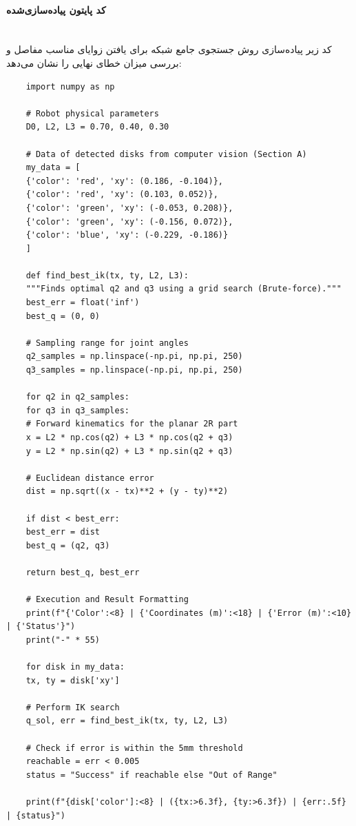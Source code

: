 \documentclass{article}
\begin{document}
\paragraph{کد پایتون پیاده‌سازی‌شده}\mbox{}\\
کد زیر پیاده‌سازی روش جستجوی جامع شبکه برای یافتن زوایای مناسب مفاصل و بررسی میزان خطای نهایی را نشان می‌دهد:
\begin{latin}
\begin{LTR}
\begin{verbatim}
	import numpy as np
	
	# Robot physical parameters
	D0, L2, L3 = 0.70, 0.40, 0.30
	
	# Data of detected disks from computer vision (Section A)
	my_data = [
	{'color': 'red', 'xy': (0.186, -0.104)},
	{'color': 'red', 'xy': (0.103, 0.052)},
	{'color': 'green', 'xy': (-0.053, 0.208)},
	{'color': 'green', 'xy': (-0.156, 0.072)},
	{'color': 'blue', 'xy': (-0.229, -0.186)}
	]
	
	def find_best_ik(tx, ty, L2, L3):
	"""Finds optimal q2 and q3 using a grid search (Brute-force)."""
	best_err = float('inf')
	best_q = (0, 0)
	
	# Sampling range for joint angles
	q2_samples = np.linspace(-np.pi, np.pi, 250)
	q3_samples = np.linspace(-np.pi, np.pi, 250)
	
	for q2 in q2_samples:
	for q3 in q3_samples:
	# Forward kinematics for the planar 2R part
	x = L2 * np.cos(q2) + L3 * np.cos(q2 + q3)
	y = L2 * np.sin(q2) + L3 * np.sin(q2 + q3)
	
	# Euclidean distance error
	dist = np.sqrt((x - tx)**2 + (y - ty)**2)
	
	if dist < best_err:
	best_err = dist
	best_q = (q2, q3)
	
	return best_q, best_err
	
	# Execution and Result Formatting
	print(f"{'Color':<8} | {'Coordinates (m)':<18} | {'Error (m)':<10} | {'Status'}")
	print("-" * 55)
	
	for disk in my_data:
	tx, ty = disk['xy']
	
	# Perform IK search
	q_sol, err = find_best_ik(tx, ty, L2, L3)
	
	# Check if error is within the 5mm threshold
	reachable = err < 0.005
	status = "Success" if reachable else "Out of Range"
	
	print(f"{disk['color']:<8} | ({tx:>6.3f}, {ty:>6.3f}) | {err:.5f}   | {status}")
\end{verbatim}
\end{LTR}
\end{latin}
\end{document}
